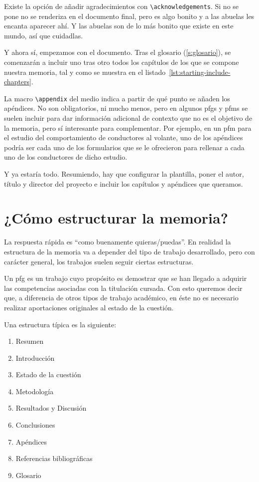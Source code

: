 Existe la opción de añadir agradecimientos con \lstinline{\acknowledgements}. Si no se pone no se renderiza en el documento final, pero es algo bonito y a las abuelas les encanta aparecer ahí. Y las abuelas son de lo más bonito que existe en este mundo, así que cuidadlas.

Y ahora sí, empezamos con el documento. Tras el glosario (\autoref{s:glosario}), se comenzarán a incluir uno tras otro todos los capítulos de los que se compone nuestra memoria, tal y como se muestra en el listado~\ref{lst:starting-include-chapters}.



La macro \lstinline{\appendix} del medio indica a partir de qué punto se añaden los apéndices. No son obligatorios, ni mucho menos, pero en algunos \glspl{pfg} y \glspl{pfm} se suelen incluir para dar información adicional de contexto que no es el objetivo de la memoria, pero sí interesante para complementar. Por ejemplo, en un \gls{pfm} para el estudio del comportamiento de conductores al volante, uno de los apéndices podría ser cada uno de los formularios que se le ofrecieron para rellenar a cada uno de los conductores de dicho estudio.

Y ya estaría todo. Resumiendo, hay que configurar la plantilla, poner el autor, título y director del proyecto e incluir los capítulos y apéndices que queramos.

\section{¿Cómo estructurar la memoria?}
\label{s:como-estructurar}

La respuesta rápida es \enquote{como buenamente quieras/puedas}. En realidad la estructura de la memoria va a depender del tipo de trabajo desarrollado, pero con carácter general, los trabajos suelen seguir ciertas estructuras.

Un \gls{pfg} es un trabajo cuyo propósito es demostrar que se han llegado a adquirir las competencias asociadas con la titulación cursada. Con esto queremos decir que, a diferencia de otros tipos de trabajo académico, en éste no es necesario realizar aportaciones originales al estado de la cuestión.

Una estructura típica es la siguiente:

\begin{enumerate}
    \item Resumen
    \item Introducción
    \item Estado de la cuestión
    \item Metodología
    \item Resultados y Discusión
    \item Conclusiones
    \item Apéndices
    \item Referencias bibliográficas
    \item Glosario
\end{enumerate}

